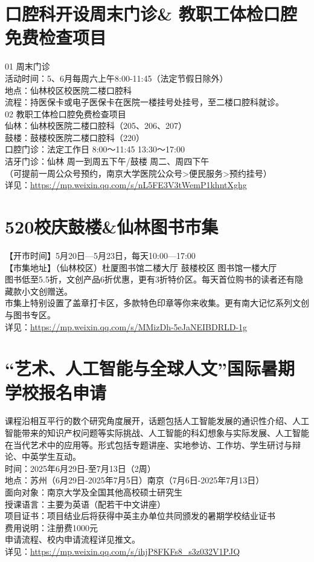 \documentclass[letterpaper, 12pt]{article}
\begin{document}
\begin{multicols}{2}
\section{口腔科开设周末门诊\& 教职工体检口腔免费检查项目} %
01 周末门诊
\\活动时间：5、6月每周六上午8:00-11:45（法定节假日除外）
\\地点：仙林校区校医院二楼口腔科
\\流程：持医保卡或电子医保卡在医院一楼挂号处挂号，至二楼口腔科就诊。
\\02 教职工体检口腔免费检查项目
\\仙林：仙林校医院二楼口腔科（205、206、207）
\\鼓楼：鼓楼校医院二楼口腔科（220）
\\口腔门诊：法定工作日 8:00～11:45 13:30～17:00
\\洁牙门诊：仙林 周一到周五下午/鼓楼 周二、周四下午
\\（可提前一周公众号预约，南京大学医院公众号>便民服务>预约挂号）
\\详见：\url{https://mp.weixin.qq.com/s/nL5FE3V3tWemP1khntXghg}

\section{520校庆鼓楼\&仙林图书市集} %
【开市时间】5月20日—5月23日，每天10:00—17:00
\\【市集地址】（仙林校区）杜厦图书馆二楼大厅  鼓楼校区 图书馆一楼大厅 
\\图书低至5.5折，文创产品6折优惠，更有3折特价区。每天首位购书的读者还有隐藏款小文创赠送。
\\市集上特别设置了盖章打卡区，多款特色印章等你来收集。更有南大记忆系列文创与图书专区。
\\详见：\url{https://mp.weixin.qq.com/s/MMizDh-5eJaNEIBDRLD-1g}

\section{“艺术、人工智能与全球人文”国际暑期学校报名申请} %
课程沿相互平行的数个研究角度展开，话题包括人工智能发展的通识性介绍、人工智能带来的知识产权问题等实际挑战、人工智能的科幻想象与实际发展、人工智能在当代艺术中的应用等。形式包括专题讲座、实地参访、工作坊、学生研讨与辩论、中英学生互动。
\\时间：2025年6月29日-至7月13日（2周）
\\地点：苏州（6月29日-2025年7月5日）南京（7月6日-2025年7月13日）
\\面向对象：南京大学及全国其他高校硕士研究生
\\授课语言：主要为英语（配若干中文讲座）
\\项目证书：项目结业后将获得中英主办单位共同颁发的暑期学校结业证书
\\费用说明：注册费1000元
\\申请流程、校内申请流程详见推文。
\\详见：\url{https://mp.weixin.qq.com/s/ihjP8FKFs8_s3z032V1PJQ}


\end{multicols}
\end{document}
